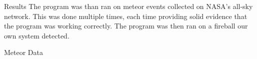 \documentclass[final]{beamer}
\newlength{\twocolwid}
\begin{document}
\begin{frame}[t]
\begin{columns}[t]
\begin{column}{\twocolwid}









\begin{block}{Results}
The program was than ran on meteor events collected on NASA's all-sky network. This was done multiple times, each time providing solid evidence that the program was working correctly. The program was then ran on a fireball our own system detected.
\end{block}

\begin{alertblock}{Meteor Data}


\end{alertblock}
\end{column}
\end{columns}
\end{frame}
\end{document}
